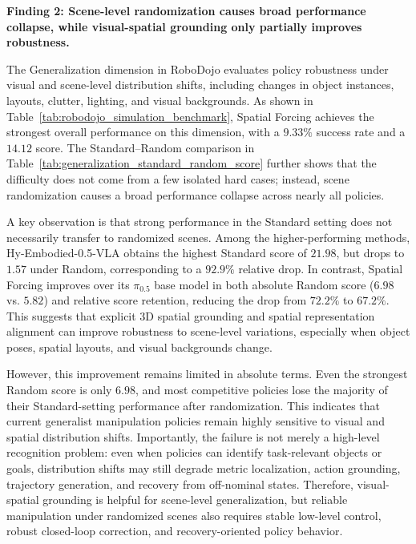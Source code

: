 \textcolor{Blue_1}{\textbf{Finding 2: Scene-level randomization causes broad performance collapse, while visual-spatial grounding only partially improves robustness.}}

The Generalization dimension in RoboDojo evaluates policy robustness under visual and scene-level distribution shifts, including changes in object instances, layouts, clutter, lighting, and visual backgrounds. As shown in Table~\ref{tab:robodojo_simulation_benchmark}, Spatial Forcing achieves the strongest overall performance on this dimension, with a $9.33\%$ success rate and a $14.12$ score. The Standard--Random comparison in Table~\ref{tab:generalization_standard_random_score} further shows that the difficulty does not come from a few isolated hard cases; instead, scene randomization causes a broad performance collapse across nearly all policies.

A key observation is that strong performance in the Standard setting does not necessarily transfer to randomized scenes. Among the higher-performing methods, Hy-Embodied-0.5-VLA obtains the highest Standard score of $21.98$, but drops to $1.57$ under Random, corresponding to a $92.9\%$ relative drop. In contrast, Spatial Forcing improves over its $\pi_{0.5}$ base model in both absolute Random score ($6.98$ vs. $5.82$) and relative score retention, reducing the drop from $72.2\%$ to $67.2\%$. This suggests that explicit 3D spatial grounding and spatial representation alignment can improve robustness to scene-level variations, especially when object poses, spatial layouts, and visual backgrounds change.

However, this improvement remains limited in absolute terms. Even the strongest Random score is only $6.98$, and most competitive policies lose the majority of their Standard-setting performance after randomization. This indicates that current generalist manipulation policies remain highly sensitive to visual and spatial distribution shifts. Importantly, the failure is not merely a high-level recognition problem: even when policies can identify task-relevant objects or goals, distribution shifts may still degrade metric localization, action grounding, trajectory generation, and recovery from off-nominal states. Therefore, visual-spatial grounding is helpful for scene-level generalization, but reliable manipulation under randomized scenes also requires stable low-level control, robust closed-loop correction, and recovery-oriented policy behavior.



